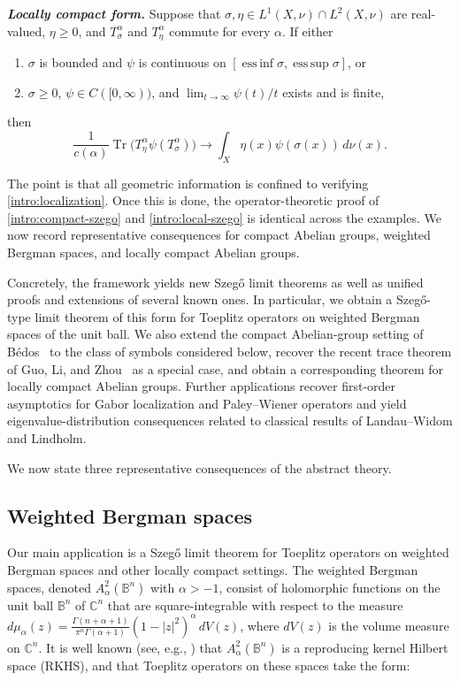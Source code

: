 \documentclass{amsart}
\theoremstyle{definition}
\theoremstyle{remark}
\numberwithin{equation}{section}
\begin{document}
\smallskip
\noindent\textbf{\emph{Locally compact form.}}
Suppose that
$\sigma,\eta\in L^1(X,\nu)\cap L^2(X,\nu)$ are real-valued,
$\eta\geq0$, and $T_\sigma^\alpha$ and $T_\eta^\alpha$ commute for every
$\alpha$.  If either
\begin{enumerate}
  \item $\sigma$ is bounded and $\psi$ is continuous on
  $[\operatorname*{ess\,inf}\sigma,\operatorname*{ess\,sup}\sigma]$, or
  \item $\sigma\geq0$, $\psi\in C([0,\infty))$, and
  $\lim_{t\to\infty}\psi(t)/t$ exists and is finite,
\end{enumerate}
then
\begin{equation}
  \frac{1}{c(\alpha)}
  \operatorname{Tr}\bigl(T_\eta^\alpha\psi(T_\sigma^\alpha)\bigr)
  \longrightarrow
  \int_X\eta(x)\psi(\sigma(x))\,d\nu(x).
  \label{intro:local-szego}
\end{equation}

The point is that all geometric information is confined to verifying
\eqref{intro:localization}.  Once this is done, the operator-theoretic proof
of \eqref{intro:compact-szego} and \eqref{intro:local-szego} is identical
across the examples.  We now record representative consequences for compact
Abelian groups, weighted Bergman spaces, and locally compact Abelian groups.

Concretely, the framework yields new Szeg\H{o} limit theorems as well as unified proofs and extensions of several known ones. In particular, we obtain a Szeg\H{o}-type limit theorem of this form for Toeplitz operators on weighted Bergman spaces of the unit ball. We also extend the compact Abelian-group setting of B\'edos~\cite{bedos1996folner} to the class of symbols considered below, recover the recent trace theorem of Guo, Li, and Zhou~\cite{guo2024first} as a special case, and obtain a corresponding theorem for locally compact Abelian groups. Further applications recover first-order asymptotics for Gabor localization and Paley--Wiener operators and yield eigenvalue-distribution consequences related to classical results of Landau--Widom and Lindholm.

We now state three representative consequences of the abstract theory.





\subsection{Weighted Bergman spaces}
 Our main application is a Szeg\H{o} limit theorem for Toeplitz operators on weighted Bergman spaces and other locally compact settings. 
The weighted Bergman spaces, denoted $A_\alpha^2(\mathbb{B}^{n})$ with $\alpha > -1$, consist of holomorphic functions on the unit ball $\mathbb{B}^{n}$ of $\mathbb{C}^n$ that are square-integrable with respect to the measure $d\mu_\alpha(z)=\frac{\Gamma(n+\alpha+1)}{\pi^{n}\Gamma(\alpha+1)}(1-|z|^2)^\alpha \, dV(z)$, 
where $dV(z)$ is the volume measure on $\mathbb{C}^n$. 
It is well known (see, e.g., \cite{Z90}) that $A_\alpha^2(\mathbb{B}^{n})$ is a reproducing kernel Hilbert space (RKHS), 
and that Toeplitz operators on these spaces take the form:
\end{document}
